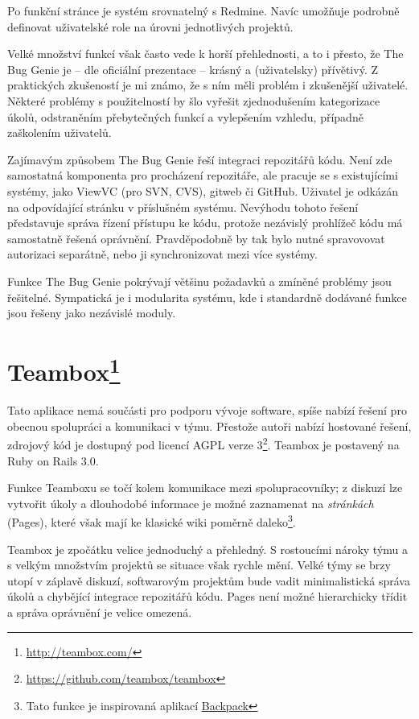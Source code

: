 \documentclass[thesis=B,czech]{FITthesis}[2012/05/02]
\begin{document}
Po funkční stránce je systém srovnatelný s Redmine. Navíc umožňuje
podrobně definovat uživatelské role na úrovni jednotlivých projektů.

Velké množství funkcí však často vede k horší přehlednosti, a to i přesto, že
The Bug Genie je -- dle oficiální prezentace -- krásný a
(uživatelsky) přívětivý. Z praktických zkušeností je mi známo, že s ním měli problém i
zkušenější uživatelé. Některé problémy s použitelností by šlo vyřešit
zjednodušením kategorizace úkolů, odstraněním přebytečných funkcí a
vylepšením vzhledu, případně zaškolením uživatelů.

Zajímavým způsobem The Bug Genie řeší integraci repozitářů kódu. 
Není zde samostatná komponenta pro procházení repozitáře, ale pracuje
se s existujícími systémy, jako ViewVC (pro SVN, CVS), gitweb či GitHub.
Uživatel je odkázán na odpovídající stránku v příslušném systému.
Nevýhodu tohoto řešení představuje správa řízení přístupu ke kódu, protože
nezávislý prohlížeč kódu má samostatně řešená oprávnění. Pravděpodobně
by tak bylo nutné spravovovat autorizaci separátně, nebo ji
synchronizovat mezi více systémy.

Funkce The Bug Genie pokrývají většinu požadavků a zmíněné problémy jsou
řešitelné. Sympatická je i modularita systému, kde i standardně dodávané
funkce jsou řešeny jako nezávislé moduly.

\section[Teambox]{Teambox\footnote{\url{http://teambox.com/}}}

Tato aplikace nemá součásti pro podporu vývoje software, spíše nabízí
řešení pro obecnou spolupráci a komunikaci v týmu. Přestože autoři
nabízí hostované řešení, zdrojový kód je dostupný pod licencí \gls{AGPL}
verze 3\footnote{\url{https://github.com/teambox/teambox}}. Teambox je
postavený na Ruby on Rails 3.0.

Funkce Teamboxu se točí kolem komunikace mezi spolupracovníky; z diskuzí
lze vytvořit úkoly a dlouhodobé informace je možné zaznamenat na
\emph{stránkách} (Pages), které však mají ke klasické wiki poměrně
daleko\footnote{Tato funkce je inspirovaná aplikací
  \href{http://backpackit.com/}{Backpack}}.

Teambox je zpočátku velice jednoduchý a přehledný.
S rostoucími nároky týmu a s velkým množstvím projektů se situace však rychle mění.
Velké týmy se brzy utopí v záplavě diskuzí, softwarovým projektům
bude vadit minimalistická správa úkolů a chybějící integrace repozitářů
kódu. Pages není možné hierarchicky třídit a správa oprávnění je velice
omezená.
\end{document}
